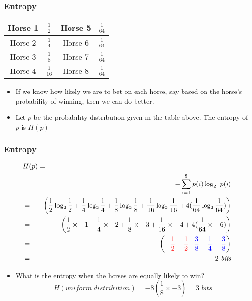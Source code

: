 \begin{frame}
\frametitle{Entropy}
\begin{center}
\begin{tabular}{|cc|cc|}
\hline
Horse 1 & $\frac{1}{2}$ & Horse 5 & $\frac{1}{64}$ \\
\hline
Horse 2 & $\frac{1}{4}$ & Horse 6 & $\frac{1}{64}$ \\
\hline
Horse 3 & $\frac{1}{8}$ & Horse 7 & $\frac{1}{64}$ \\
\hline
Horse 4 & $\frac{1}{16}$ & Horse 8 & $\frac{1}{64}$ \\
\hline
\end{tabular}
\end{center}
\begin{itemize}[<+->]
\item If we know how likely we are to bet on each horse, say based on
  the horse's probability of winning, then we can do better.
\item Let $p$ be the probability distribution given in the
table above. The entropy of $p$ is $H(p)$
\end{itemize}

\end{frame}

\begin{frame}
\frametitle{Entropy}
\begin{eqnarray*}
\lefteqn{ H(p) = } \nonumber \\
&=& - \sum^{8}_{i=1} p(i) \log_2\ p(i) \nonumber \\
&=& - \left( \frac{1}{2} \log_2 \frac{1}{2} + \frac{1}{4} \log_2 \frac{1}{4} +
\frac{1}{8} \log_2 \frac{1}{8} + \frac{1}{16} \log_2 \frac{1}{16} +
4 (\frac{1}{64} \log_2 \frac{1}{64}) \right) \nonumber \\
&=& - \left( \frac{1}{2} \times -1 + \frac{1}{4} \times -2 +
\frac{1}{8} \times -3 + \frac{1}{16} \times -4 +
4 (\frac{1}{64} \times -6 ) \right) \nonumber \\
&=& - \left( {\color{red}-\frac{1}{2} - \frac{1}{2}} {\color{blue} - \frac{3}{8} - \frac{1}{4} - \frac{3}{8}} \right) \nonumber \\
&=& 2\ \textit{bits}
\end{eqnarray*}

\begin{itemize}[<+->]
\item What is the entropy when the horses are equally likely to win?
\[ H(\textit{uniform distribution}) = - 8 (\frac{1}{8} \times -3) = 3 \textit{ bits} \]
\end{itemize}

\end{frame}

